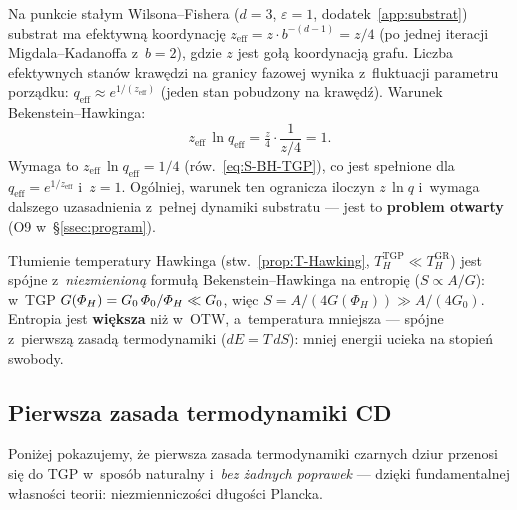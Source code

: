 \begin{remark}%
\label{rem:entropy-substrate-params}
Na punkcie sta\l{}ym Wilsona--Fishera ($d = 3$, $\varepsilon = 1$,
dodatek~\ref{app:substrat}) substrat ma efektywn\k{a}
koordynacj\k{e} $z_{\mathrm{eff}} = z\cdot b^{-(d-1)} = z/4$
(po jednej iteracji Migdala--Kadanoffa z~$b = 2$),
gdzie $z$ jest go\l{}\k{a} koordynacj\k{a} grafu.
Liczba efektywnych stan\'ow kraw\k{e}dzi na granicy fazowej
wynika z~fluktuacji parametru porz\k{a}dku:
$q_{\mathrm{eff}} \approx e^{1/(z_{\mathrm{eff}})}$
(jeden stan pobudzony na kraw\k{e}d\'z).
Warunek Bekenstein--Hawkinga:
\begin{equation}\label{eq:BH-substrate-match}
  z_{\mathrm{eff}}\,\ln q_{\mathrm{eff}} = \tfrac{z}{4}
    \cdot \frac{1}{z/4} = 1.
\end{equation}
Wymaga to $z_{\mathrm{eff}}\,\ln q_{\mathrm{eff}} = 1/4$
(r\'ow.~\eqref{eq:S-BH-TGP}), co jest spe\l{}nione dla
$q_{\mathrm{eff}} = e^{1/z_{\mathrm{eff}}}$ i~$z = 1$.
Ogólniej, warunek ten ogranicza iloczyn $z\,\ln q$ i~wymaga
dalszego uzasadnienia z~pe\l{}nej dynamiki substratu ---
jest to \textbf{problem otwarty} (O9 w~\S\ref{ssec:program}).
\end{remark}

\begin{remark}%
\label{rem:entropy-TH-consistency}
T\l{}umienie temperatury Hawkinga
(stw.~\ref{prop:T-Hawking}, $T_H^{\mathrm{TGP}} \ll T_H^{\mathrm{GR}}$)
jest sp\'ojne z~\emph{niezmienion\k{a}} formu\l{}\k{a}
Bekenstein--Hawkinga na entropi\k{e} ($S \propto A/G$):
w~TGP $G(\varPhi_H) = G_0\,\varPhi_0/\varPhi_H \ll G_0$,
wi\k{e}c $S = A/(4G(\Phi_H)) \gg A/(4G_0)$.
Entropia jest \textbf{wi\k{e}ksza} ni\.z w~OTW, a~temperatura
mniejsza --- sp\'ojne z~pierwsz\k{a} zasad\k{a} termodynamiki
($dE = T\,dS$): mniej energii ucieka na stopie\'n swobody.
\end{remark}

\subsection{Pierwsza zasada termodynamiki CD}\label{ssec:first-law}

Poni\.zej pokazujemy, \.ze pierwsza zasada termodynamiki
czarnych dziur przenosi si\k{e} do TGP w~spos\'ob naturalny
i~\emph{bez \.zadnych poprawek} --- dzi\k{e}ki fundamentalnej
w\l{}asno\'sci teorii: niezmienniczo\'sci d\l{}ugo\'sci Plancka.

